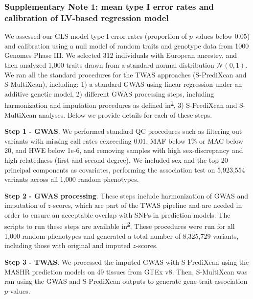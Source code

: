 \documentclass[
  a4paper,
]{article}
\begin{document}
\setcounter{figure}{0}

\hypertarget{sm:reg:null_sim}{%
\subsubsection{Supplementary Note 1: mean type I error rates and calibration of LV-based regression model}\label{sm:reg:null_sim}}

We assessed our GLS model type I error rates (proportion of \(p\)-values below 0.05) and calibration using a null model of random traits and genotype data from 1000 Genomes Phase III.
We selected 312 individuals with European ancestry, and then analyzed 1,000 traits drawn from a standard normal distribution \(\mathcal{N}(0,1)\).
We ran all the standard procedures for the TWAS approaches (S-PrediXcan and S-MultiXcan), including:
1) a standard GWAS using linear regression under an additive genetic model,
2) different GWAS processing steps, including harmonization and imputation procedures as defined in\textsuperscript{\protect\hyperlink{ref-SiobXsoB}{1}},
3) S-PrediXcan and S-MultiXcan analyses.
Below we provide details for each of these steps.

\textbf{Step 1 - GWAS}. We performed standard QC procedures such as
filtering out variants with missing call rates eexceeding 0.01, MAF below 1\% or MAC below 20, and HWE below 1e-6,
and removing samples with high sex-discrepancy and high-relatedness (first and second degree).
We included sex and the top 20 principal components as covariates, performing the association test on 5,923,554 variants across all 1,000 random phenotypes.

\textbf{Step 2 - GWAS processing}. These steps include harmonization of GWAS and imputation of \(z\)-scores, which are part of the TWAS pipeline and are needed in order to ensure an acceptable overlap with SNPs in prediction models.
The scripts to run these steps are available in\textsuperscript{\protect\hyperlink{ref-GPHGnFRN}{2}}.
These procedures were run for all 1,000 random phenotypes and generated a total number of 8,325,729 variants, including those with original and imputed \(z\)-scores.

\textbf{Step 3 - TWAS}. We processed the imputed GWAS with S-PrediXcan using the MASHR prediction models on 49 tissues from GTEx v8.
Then, S-MultiXcan was ran using the GWAS and S-PrediXcan outputs to generate gene-trait association \(p\)-values.
\end{document}
